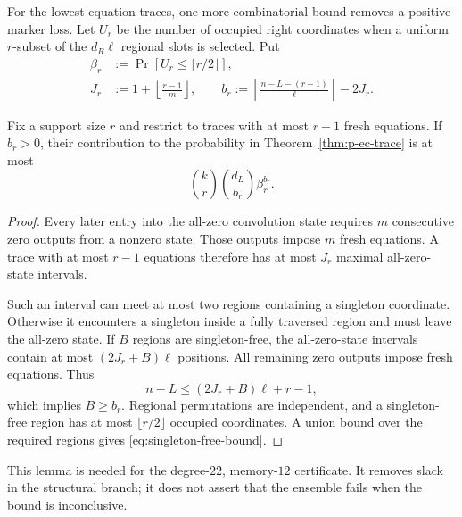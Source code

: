 For the lowest-equation traces, one more combinatorial bound removes a
positive-marker loss.  Let $U_r$ be the number of occupied right coordinates
when a uniform $r$-subset of the $d_R\ell$ regional slots is selected.  Put
\begin{align}
 \beta_r&:=\Pr[U_r\leq\lfloor r/2\rfloor],
 \label{eq:singleton-free-probability}\\
 J_r&:=1+\left\lfloor\frac{r-1}{m}\right\rfloor,
 \qquad
 b_r:=\left\lceil\frac{n-L-(r-1)}{\ell}\right\rceil-2J_r.
 \label{eq:required-singleton-free-regions}
\end{align}

\begin{lemma}
\label{lem:singleton-free-regions}
Fix a support size $r$ and restrict to traces with at most $r-1$ fresh
equations.  If $b_r>0$, their contribution to the probability in
Theorem~\ref{thm:p-ec-trace} is at most
\begin{equation}
 \binom{k}{r}\binom{d_L}{b_r}\beta_r^{b_r}.
 \label{eq:singleton-free-bound}
\end{equation}
\end{lemma}

\begin{proof}
Every later entry into the all-zero convolution state requires $m$
consecutive zero outputs from a nonzero state.  Those outputs impose $m$
fresh equations.  A trace with at most $r-1$ equations therefore has at most
$J_r$ maximal all-zero-state intervals.

Such an interval can meet at most two regions containing a singleton
coordinate.  Otherwise it encounters a singleton inside a fully traversed
region and must leave the all-zero state.  If $B$ regions are singleton-free,
the all-zero-state intervals contain at most $(2J_r+B)\ell$ positions.  All
remaining zero outputs impose fresh equations.  Thus
\[
 n-L\leq(2J_r+B)\ell+r-1,
\]
which implies $B\geq b_r$.  Regional permutations are independent, and a
singleton-free region has at most $\lfloor r/2\rfloor$ occupied coordinates.
A union bound over the required regions gives \eqref{eq:singleton-free-bound}.
\end{proof}

This lemma is needed for the degree-$22$, memory-$12$ certificate.  It removes
slack in the structural branch; it does not assert that the ensemble fails
when the bound is inconclusive.

